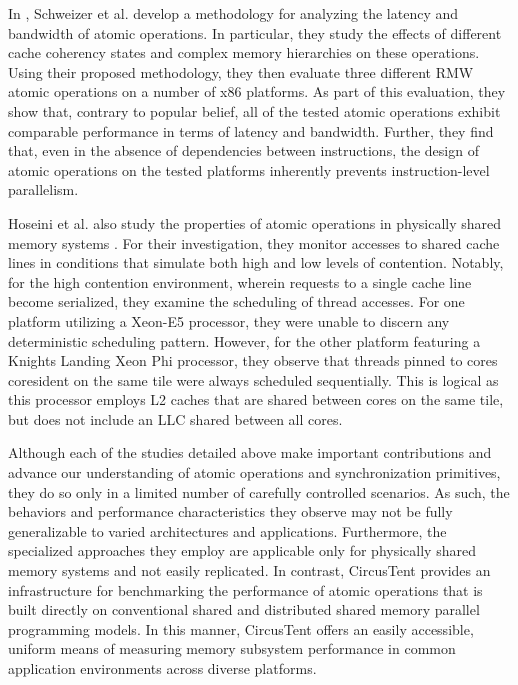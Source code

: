 In \cite{schweizer2015evaluating}, Schweizer et al. develop a methodology for analyzing the latency and bandwidth of atomic operations.
In particular, they study the effects of different cache coherency states and complex memory hierarchies on these operations.
Using their proposed methodology, they then evaluate three different RMW atomic operations on a number of x86 platforms.
As part of this evaluation, they show that, contrary to popular belief, all of the tested atomic operations exhibit comparable performance in terms of latency and bandwidth.
Further, they find that, even in the absence of dependencies between instructions, the design of atomic operations on the tested platforms inherently prevents instruction-level parallelism.

Hoseini et al. also study the properties of atomic operations in physically shared memory systems \cite{hoseini2019modeling}.
For their investigation, they monitor accesses to shared cache lines in conditions that simulate both high and low levels of contention.
Notably, for the high contention environment, wherein requests to a single cache line become serialized, they examine the scheduling of thread accesses.
For one platform utilizing a Xeon-E5 processor, they were unable to discern any deterministic scheduling pattern.
However, for the other platform featuring a Knights Landing Xeon Phi processor, they observe that threads pinned to cores coresident on the same tile were always scheduled sequentially.
This is logical as this processor employs L2 caches that are shared between cores on the same tile, but does not include an LLC shared between all cores.

Although each of the studies detailed above make important contributions and advance our understanding of atomic operations and synchronization primitives, they do so only in a limited number of carefully controlled scenarios.
As such, the behaviors and performance characteristics they observe may not be fully generalizable to varied architectures and applications.
Furthermore, the specialized approaches they employ are applicable only for physically shared memory systems and not easily replicated.
In contrast, CircusTent provides an infrastructure for benchmarking the performance of atomic operations that is built directly on conventional shared and distributed shared memory parallel programming models.
In this manner, CircusTent offers an easily accessible, uniform means of measuring memory subsystem performance in common application environments across diverse platforms.

